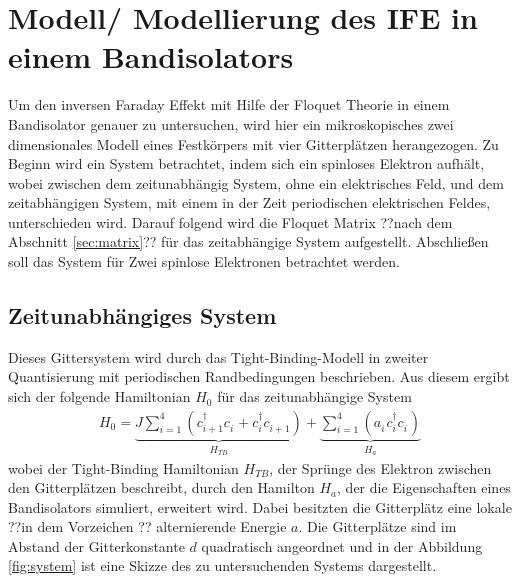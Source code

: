 \chapter{Modell/ Modellierung des IFE in einem Bandisolators}
\label{sec:model}
Um den inversen Faraday Effekt mit Hilfe der Floquet Theorie in
einem Bandisolator genauer zu untersuchen, wird hier ein mikroskopisches zwei dimensionales Modell
eines Festkörpers mit vier Gitterplätzen herangezogen. Zu Beginn
wird ein System betrachtet, indem sich ein spinloses Elektron aufhält, wobei zwischen dem
zeitunabhängig System, ohne ein elektrisches Feld,
und dem zeitabhängigen System, mit einem in der Zeit periodischen elektrischen Feldes, unterschieden wird.
Darauf folgend wird die Floquet Matrix ??nach dem Abschnitt \ref{sec:matrix}?? für das
zeitabhängige System aufgestellt. Abschließen soll das System für Zwei spinlose Elektronen betrachtet werden.




\section{Zeitunabhängiges System}
Dieses Gittersystem wird durch das Tight-Binding-Modell in zweiter Quantisierung mit periodischen Randbedingungen\cite{czycholl} beschrieben.
Aus diesem ergibt sich der folgende Hamiltonian $H_0$ für das zeitunabhängige System %
\begin{align}
  H_0=\underbrace{J\sum_{i=1}^4 \left(c_{i+1}^\dag c_i^{\phantom{\dag}} + c_{i}^\dag c_{i+1}^{\phantom{\dag}}\right)}_{H_{TB}}
   +\underbrace{\sum_{i=1}^4\left( a_i^{\phantom{\dag}} c_i^\dag c_i^{\phantom{\dag}} \right)}_{H_a}
\end{align}
wobei der Tight-Binding Hamiltonian $H_{TB}$, der Sprünge des Elektron
zwischen den Gitterplätzen beschreibt, durch den Hamilton $H_a$, der die Eigenschaften
eines Bandisolators simuliert, erweitert wird.
Dabei besitzten die Gitterplätz eine lokale ??in dem Vorzeichen ?? alternierende Energie $a$.
Die Gitterplätze sind im Abstand der Gitterkonstante $d$ quadratisch angeordnet
und in der Abbildung \ref{fig:system}
ist eine Skizze des zu untersuchenden Systems dargestellt.


